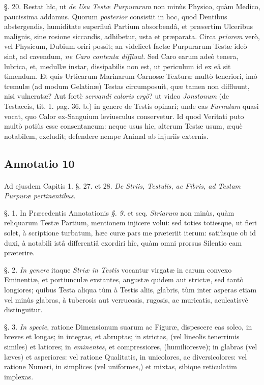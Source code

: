 \documentclass[a4paper, 11pt, oneside, polutonikogreek, german]{article}
\begin{document}
§. 20. Restat hîc, ut \emph{de Usu Testæ Purpurarum} non minùs Physico, quàm Medico, paucissima addamus. Quorum \emph{posterior} consistit in hoc, quod Dentibus abstergendis, humiditate superfluâ Partium absorbendâ, et præsertim Ulceribus malignis, sine rosione siccandis, adhibetur, usta et præparata. Circa \emph{priorem} verò, vel Physicum, Dubium oriri possit; an videlicet factæ Purpurarum Testæ ideò sint, ad cavendum, \emph{ne Caro contenta diffluat}. Sed Caro earum adeò tenera, lubrica, et, medullæ instar, dissipabilis non est, ut periculum id ex eâ sit timendum. Et quis Urticarum Marinarum Carnosæ Texturæ multò teneriori, imò tremulæ (ad modum Gelatinæ) Testas circumposuit, quæ tamen non diffluunt, nisi vulneratæ? Aut fortè \emph{servandi caloris ergò}? ut video \emph{Jonstonum} (de Testaceis, tit. 1. pag. 36. b.) in genere de Testis opinari; unde eas \emph{Furnulum} quasi vocat, quo Calor ex-Sanguium leviusculus conservetur. Id quod Veritati puto multò potiùs esse consentaneum: neque usus hic, alterum Testæ usum, æquè notabilem, excludit; defendere nempe Animal ab injuriis externis.

\subsection{Annotatio 10}
\paragraph{}
Ad ejusdem Capitis 1. §. 27. et 28. \emph{De Striis, Testulis, ac Fibris, ad Testam Purpuræ pertinentibus}.

§. 1. In Præcedentis Annotationis \emph{§. 9.} et seq. \emph{Striarum} non minùs, quàm reliquarum Testæ Partium, mentionem injicere volui: sed toties totiesque, ut fieri solet, à scriptione turbatum, hæc curæ pars me præteriit iterum: satiùsque ob id duxi, à notabili istâ differentiâ exordiri hîc, quàm omni prorsus Silentio eam præterire.

§. 2. \emph{In genere} itaque \emph{Striæ in Testis} vocantur virgatæ in earum convexo Eminentiæ, et portiunculæ exstantes, angustæ quidem aut strictæ, sed tantò longiores; quibus Testa aliqua tùm à Testis aliis, glabris, tùm inter asperas etiam vel minùs glabras, à tuberosis aut verrucosis, rugosis, ac muricatis, aculeatisvè distinguitur.

§. 3. \emph{In specie}, ratione Dimensionum suarum ac Figuræ, dispescere eas soleo, in breves et longas; in integras, et abruptas; in strictas, (vel lineolis tenerrimis similes) et latiores; in \emph{eminentes}, et compressiores, (humilioresve); in glabras (vel læves) et asperiores: vel ratione Qualitatis, in unicolores, ac diversicolores: vel ratione Numeri, in simplices (vel uniformes,) et mixtas, sibique reticulatim implexas.
\end{document}
